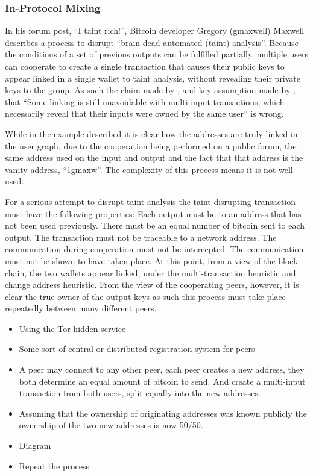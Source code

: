 \subsubsection{In-Protocol Mixing}
In his forum post, ``I taint rich!'', Bitcoin developer Gregory (gmaxwell) Maxwell describes a process to disrupt ``brain-dead automated (taint) analysis''.  Because the conditions of a set of previous outputs can be fulfilled partially, multiple users can cooperate to create a single transaction that causes their public keys to appear linked in a single wallet to taint analysis, without revealing their private keys to the group.  As such the claim made by \textcite{satoshi}, and key assumption made by \textcite{reid-anon}, that ``Some linking is still unavoidable with multi-input transactions, which necessarily reveal that their inputs were owned by the same user'' is wrong.


While in the example described it is clear how the addresses are truly linked in the user graph, due to the cooperation being performed on a public forum, the same address used on the input and output and the fact that that address is the vanity address, ``1gmaxw''. The complexity of this process means it is not well used.


For a serious attempt to disrupt taint analysis the taint disrupting transaction must have the following properties:  Each output must be to an address that has not been used previously. There must be an equal number of bitcoin sent to each output. The transaction must not be traceable to a network address.  The communication during cooperation must not be intercepted. The communication must not be shown to have taken place.  At this point, from a view of the block chain, the two wallets appear linked, under the multi-transaction heuristic and change address heuristic. From the view of the cooperating peers, however, it is clear the true owner of the output keys as such this process must take place repeatedly between many different peers.

\begin{itemize} \item Using the Tor hidden service \item Some sort of central or
        distributed registration system for peers \item A peer may connect to
            any other peer, each peer creates a new address, they both determine
            an equal amount of bitcoin to send. And create a multi-input
            transaction from both users, split equally into the new addresses.
\item Assuming that the ownership of originating addresses was known publicly
the ownership of the two new addresses is now 50/50.  \item Diagram \item Repeat
the process \end{itemize}


